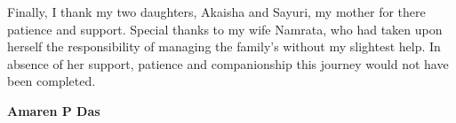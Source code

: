 Finally, I thank my two daughters, Akaisha and Sayuri, my mother for there patience  and support. Special thanks to my wife Namrata, who had taken upon herself  the responsibility of managing the family's without my slightest help. In absence of  her support, patience and companionship this journey would not have been completed. 



\bigskip
\bigskip
\bigskip
\bigskip

\hfill \textbf{Amaren P Das}

\restoregeometry
